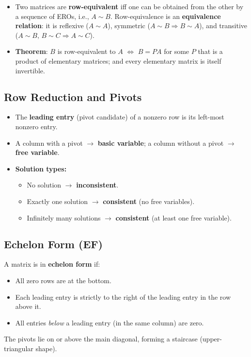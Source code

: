 \documentclass[hidelinks]{article}
\begin{document}
\begin{itemize}
    \item Two matrices are \textbf{row-equivalent} iff one can be obtained from the other by a sequence of EROs, i.e., $A \sim B$. Row-equivalence is an \textbf{equivalence relation}: it is reflexive ($A\sim A$), symmetric ($A\sim B \Rightarrow B\sim A$), and transitive ($A\sim B,\, B\sim C \Rightarrow A\sim C$).
    \item \textbf{Theorem}: $B$ is row-equivalent to $A$ $\iff$ $B = PA$ for some $P$ that is a product of elementary matrices; and every elementary matrix is itself invertible.
\end{itemize}

\subsection{Row Reduction and Pivots}
\begin{itemize}
    \item The \textbf{leading entry} (pivot candidate) of a nonzero row is its left-most nonzero entry.
    \item A column with a pivot $\rightarrow$ \textbf{basic variable}; a column without a pivot $\rightarrow$ \textbf{free variable}.
    \item \textbf{Solution types:}
    \begin{itemize}
        \item No solution $\rightarrow$ \textbf{inconsistent}.
        \item Exactly one solution $\rightarrow$ \textbf{consistent} (no free variables).
        \item Infinitely many solutions $\rightarrow$ \textbf{consistent} (at least one free variable).
    \end{itemize}
\end{itemize}

\subsection{Echelon Form (EF)}
A matrix is in \textbf{echelon form} if:
\begin{itemize}
    \item All zero rows are at the bottom.
    \item Each leading entry is strictly to the right of the leading entry in the row above it.
    \item All entries \emph{below} a leading entry (in the same column) are zero.
\end{itemize}
The pivots lie on or above the main diagonal, forming a staircase (upper-triangular shape).
\end{document}
